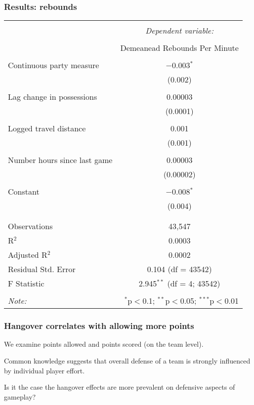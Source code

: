 \documentclass{beamer}
\begin{document}
\begin{frame}   \frametitle{Results: rebounds}
  \centering
  \tiny{
\begin{tabular}{@{\extracolsep{5pt}}lc}  \\[-1.8ex]\hline  \hline \\[-1.8ex]   & \multicolumn{1}{c}{\textit{Dependent variable:}} \\  \cline{2-2}  \\[-1.8ex] & Demeanead Rebounds Per Minute \\  \hline \\[-1.8ex]   Continuous party measure & $-$0.003$^{*}$ \\    & (0.002) \\    & \\   Lag change in possessions & 0.00003 \\    & (0.0001) \\    & \\   Logged travel distance & 0.001 \\    & (0.001) \\    & \\   Number hours since last game & 0.00003 \\    & (0.00002) \\    & \\   Constant & $-$0.008$^{*}$ \\    & (0.004) \\    & \\  \hline \\[-1.8ex]  Observations & 43,547 \\  R$^{2}$ & 0.0003 \\  Adjusted R$^{2}$ & 0.0002 \\  Residual Std. Error & 0.104 (df = 43542) \\  F Statistic & 2.945$^{**}$ (df = 4; 43542) \\  \hline  \hline \\[-1.8ex]  \textit{Note:}  & \multicolumn{1}{r}{$^{*}$p$<$0.1; $^{**}$p$<$0.05; $^{***}$p$<$0.01} \\  \end{tabular}  
} \end{frame}

\begin{frame}   \frametitle{Hangover correlates with allowing more points}
  We examine points allowed and points scored (on the team level).

  Common knowledge suggests that overall defense of a team is strongly influenced by individual player effort.

  Is it the case the hangover effects are more prevalent on defensive aspects of gameplay? \end{frame}
\end{document}
